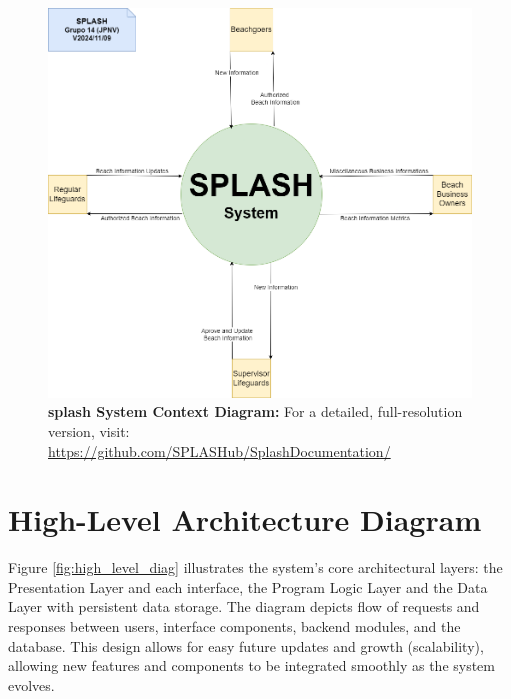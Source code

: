 \begin{figure}[H]
      \centering
      \includegraphics[width=15cm]{figs/context_diagram.png}
      \caption{ \textbf{\ac{splash} System Context Diagram:} For a detailed, full-resolution version, visit: \url{https://github.com/SPLASHub/SplashDocumentation/}}
      \label{fig:context_diag}
\end{figure}

\newpage
\section{High-Level Architecture Diagram}
\label{section:high_level_diag}

Figure \ref{fig:high_level_diag} illustrates the system’s core architectural layers: the Presentation Layer and each interface, the Program Logic Layer and the Data Layer with persistent data storage. The diagram depicts flow of requests and responses between users, interface components, backend modules, and the database. This design allows for easy future updates and growth (scalability), allowing new features and components to be integrated smoothly as the system evolves.

